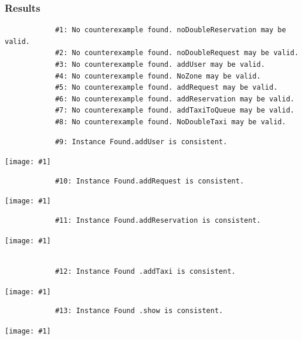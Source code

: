 \documentclass[11pt, a4paper,titlepage]{article}
\newcommand{\image}[1]{
	\begin{center}
		\noindent \texttt{[image: \#1]}
	\end{center}
	}
\begin{document}
		\subsubsection{Results}
		
		\begin{verbatim}
			#1: No counterexample found. noDoubleReservation may be valid.
			#2: No counterexample found. noDoubleRequest may be valid.
			#3: No counterexample found. addUser may be valid.
			#4: No counterexample found. NoZone may be valid.
			#5: No counterexample found. addRequest may be valid.
			#6: No counterexample found. addReservation may be valid.
			#7: No counterexample found. addTaxiToQueue may be valid.
			#8: No counterexample found. NoDoubleTaxi may be valid.
		\end{verbatim}
		
		\begin{verbatim}
			#9: Instance Found.addUser is consistent.
		\end{verbatim}
		\image{diagram_alloy1.png}
		\begin{verbatim}
			#10: Instance Found.addRequest is consistent.
		\end{verbatim}
		\image{diagram_alloy2.png}
		\begin{verbatim}
			#11: Instance Found.addReservation is consistent.
		\end{verbatim}
		\image{diagram_alloy3.png}
		\begin{verbatim}
		
			#12: Instance Found .addTaxi is consistent.
		\end{verbatim}
		\image{diagram_alloy4.png}
		\begin{verbatim}
			#13: Instance Found .show is consistent.
		\end{verbatim}
		\image{diagram_alloy5.png}
		
\end{document}
